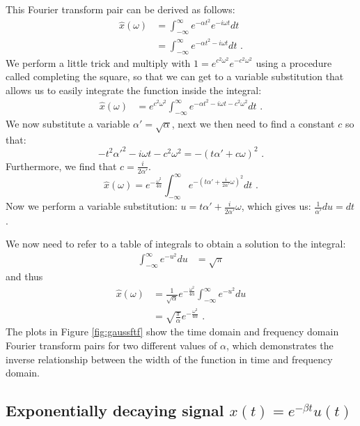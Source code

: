This Fourier transform pair can be derived as follows:
\begin{align}
    \hat{x}(\omega) & = \int_{-\infty}^{\infty} e^{-\alpha t^2} e^{-i\omega t} dt   \\
                    & = \int_{-\infty}^{\infty} e^{-\alpha t^2 - i\omega t} dt\,\,.
\end{align}
We perform a little trick and multiply with $1=e^{c^2\omega^2}e^{-c^2\omega^2}$ using a 
procedure called completing the square, so that we can get to a variable substitution 
that allows us to easily integrate the function inside the integral:
\begin{align}
    \hat{x}(\omega) & = e^{c^2 \omega^2}\int_{-\infty}^{\infty} e^{-\alpha t^2 -i\omega t - c^2 \omega^2} dt\,\,.
\end{align}
We now substitute a variable $\alpha'=\sqrt{\alpha}$, next we then need to find a constant $c$ so that:
\begin{equation}
    -t^2\alpha'^2 - i\omega t - c^2 \omega^2 = -(t \alpha' + c\omega)^2\,\,.
\end{equation}
Furthermore, we find that $c=\frac{i}{2\alpha'}$.%
\begin{equation}
    \hat{x}(\omega) = e^{-\frac{\omega^2}{4\alpha}} \int_{-\infty}^{\infty} e^{-\left(t\alpha' + \frac{i}{2\alpha'}\omega\right)^2} dt\,\,.
\end{equation}
Now we perform a variable substitution: $u=t\alpha' + \frac{i}{2\alpha'}\omega$, 
which gives us: $\frac{1}{\alpha'}du = dt$.

We now need to refer to a table of integrals to obtain a solution to the integral:
\begin{align}
    \int_{-\infty}^{\infty} e^{-u^2} du & = \sqrt{\pi}
\end{align}
and thus
\begin{align}
    \hat{x}(\omega) & = \frac{1}{\sqrt{\alpha}}e^{-\frac{\omega^2}{4\alpha}} \int_{-\infty}^{\infty} e^{-u^2} du \\
                    & =\sqrt{\frac{\pi}{\alpha}} e^{-\frac{\omega^2}{4\alpha}}\,\,.
\end{align}
The plots in Figure \ref{fig:gaussftf} show the time domain and frequency domain 
Fourier transform pairs for two different values of $\alpha$, which demonstrates 
the inverse relationship between the width of the function in time and frequency domain.

\subsection{Exponentially decaying signal $x(t) = e^{-\beta t}u(t)$}

